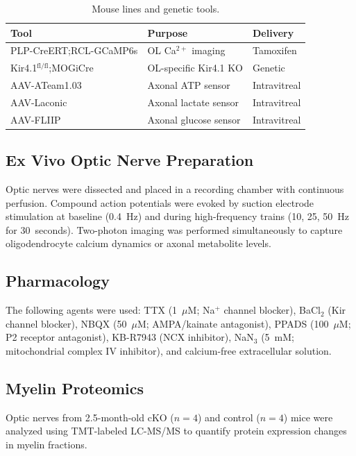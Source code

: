 \documentclass[12pt]{article}
\begin{document}
\begin{table}[ht]
\centering
\caption{Mouse lines and genetic tools.}
\label{tab:mice}
\begin{tabular}{lll}
\toprule
Tool & Purpose & Delivery \\
\midrule
PLP-CreERT;RCL-GCaMP6s & OL Ca$^{2+}$ imaging & Tamoxifen \\
Kir4.1$^{\text{fl/fl}}$;MOGiCre & OL-specific Kir4.1 KO & Genetic \\
AAV-ATeam1.03 & Axonal ATP sensor & Intravitreal \\
AAV-Laconic & Axonal lactate sensor & Intravitreal \\
AAV-FLIIP & Axonal glucose sensor & Intravitreal \\
\bottomrule
\end{tabular}
\end{table}

\subsection{Ex Vivo Optic Nerve Preparation}

Optic nerves were dissected and placed in a recording chamber with continuous perfusion. Compound action potentials were evoked by suction electrode stimulation at baseline (0.4~Hz) and during high-frequency trains (10, 25, 50~Hz for 30~seconds). Two-photon imaging was performed simultaneously to capture oligodendrocyte calcium dynamics or axonal metabolite levels.

\subsection{Pharmacology}

The following agents were used: TTX (1~$\mu$M; Na$^+$ channel blocker), BaCl$_2$ (Kir channel blocker), NBQX (50~$\mu$M; AMPA/kainate antagonist), PPADS (100~$\mu$M; P2 receptor antagonist), KB-R7943 (NCX inhibitor), NaN$_3$ (5~mM; mitochondrial complex IV inhibitor), and calcium-free extracellular solution.

\subsection{Myelin Proteomics}

Optic nerves from 2.5-month-old cKO ($n = 4$) and control ($n = 4$) mice were analyzed using TMT-labeled LC-MS/MS \citep{thompson2019tmt} to quantify protein expression changes in myelin fractions.
\end{document}
